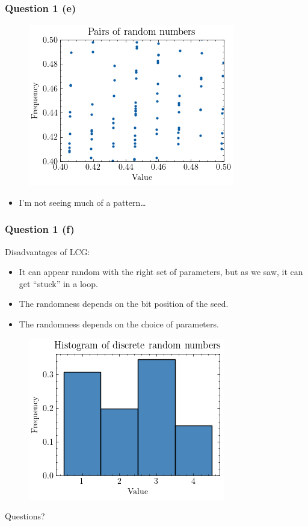 \documentclass[compress,12pt]{beamer}
\begin{document}
\begin{frame}
      \frametitle{Question 1 (e)}
      \begin{figure}
            \centering
            \includegraphics[scale=0.6]{imgs/pairs.png}
      \end{figure}
      \begin{itemize}
            \item I'm not seeing much of a pattern\dots
      \end{itemize}
\end{frame}

\begin{frame}
      \frametitle{Question 1 (f)}
      Disadvantages of LCG:
      \begin{itemize}
            \item It can appear random with the right set of parameters, but as we saw, it can get ``stuck'' in a loop.
            \item The randomness depends on the bit position of the seed.
            \item The randomness depends on the choice of parameters.
      \end{itemize}

    
\end{frame}

\begin{frame}
      \begin{figure}
            \centering
            \includegraphics[scale=0.6]{imgs/discrete.png}
      \end{figure}
      
\end{frame}

\End
\begin{frame}
      \centering
      Questions?
\end{frame}
\end{document}
